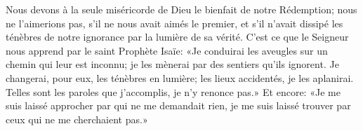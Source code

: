 Nous devons à la seule miséricorde de Dieu le bienfait de notre Rédemption;
	nous ne l’aimerions pas, s’il ne nous avait aimés le premier,
	et s’il n’avait dissipé les ténèbres de notre ignorance
	par la lumière de sa vérité.
C’est ce que le Seigneur nous apprend par le saint Prophète Isaïe:
	«Je conduirai les aveugles sur un chemin qui leur est inconnu;
	je les mènerai par des sentiers qu’ils ignorent.
Je changerai, pour eux, les ténèbres en lumière;
	les lieux accidentés, je les aplanirai.
Telles sont les paroles que j’accomplis, je n’y renonce pas.»
Et encore: «Je me suis laissé approcher par qui ne me demandait rien,
	je me suis laissé trouver par ceux qui ne me cherchaient pas.»
